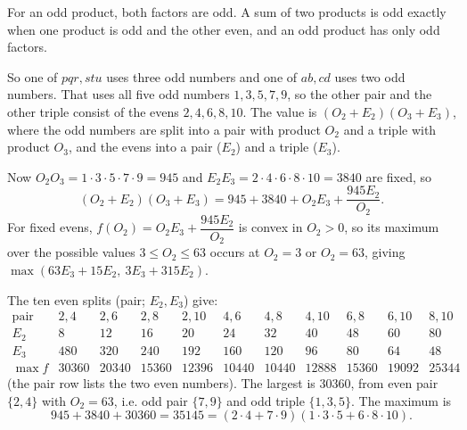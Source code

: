 For an odd product, both factors are odd. A sum of two products is odd exactly when one product is odd and the other even, and an odd product has only odd factors.

So one of $pqr,stu$ uses three odd numbers and one of $ab,cd$ uses two odd numbers. That uses all five odd numbers $1,3,5,7,9$, so the other pair and the other triple consist of the evens $2,4,6,8,10$. The value is $(O_2+E_2)(O_3+E_3)$, where the odd numbers are split into a pair with product $O_2$ and a triple with product $O_3$, and the evens into a pair ($E_2$) and a triple ($E_3$).

Now $O_2O_3=1\cdot3\cdot5\cdot7\cdot9=945$ and $E_2E_3=2\cdot4\cdot6\cdot8\cdot10=3840$ are fixed, so
\[(O_2+E_2)(O_3+E_3)=945+3840+O_2E_3+\dfrac{945E_2}{O_2}.\]
For fixed evens, $f(O_2)=O_2E_3+\dfrac{945E_2}{O_2}$ is convex in $O_2>0$, so its maximum over the possible values $3\le O_2\le63$ occurs at $O_2=3$ or $O_2=63$, giving $\max(63E_3+15E_2,\ 3E_3+315E_2)$.

The ten even splits (pair; $E_2,E_3$) give:
\[\begin{array}{c|cccccccccc}\text{pair}&2{,}4&2{,}6&2{,}8&2{,}10&4{,}6&4{,}8&4{,}10&6{,}8&6{,}10&8{,}10\\\hline E_2&8&12&16&20&24&32&40&48&60&80\\E_3&480&320&240&192&160&120&96&80&64&48\\\max f&30360&20340&15360&12396&10440&10440&12888&15360&19092&25344\end{array}\]
(the pair row lists the two even numbers). The largest is $30360$, from even pair $\{2,4\}$ with $O_2=63$, i.e. odd pair $\{7,9\}$ and odd triple $\{1,3,5\}$. The maximum is
\[945+3840+30360=\boxed{35145}=(2\cdot4+7\cdot9)(1\cdot3\cdot5+6\cdot8\cdot10).\]
